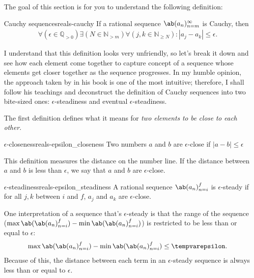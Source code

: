 The goal of this section is for you to understand the following definition:

\begin{df}{Cauchy sequences}{reals-cauchy}
  If a rational sequence $\sequence{a_n}{n = m}{\infty}$ is Cauchy, then
  \begin{align}
    \forall (\epsilon \in \mathbb{Q}_{>0}) \exists (N \in \mathbb{N}_{>m}) \forall (j, k \in \mathbb{N}_{\geq N}) : |a_j - a_k| \leq \epsilon.
  \end{align}
\end{df}

I understand that this definition looks very unfriendly, so let's break it down and
see how each element come together to capture concept of a sequence whose elements get
closer together as the sequence progresses. In my humble opinion, the approach taken
by \citeauthor{tao-1-2022} in his  book \cite{tao-1-2022} is one of the most
intuitive; therefore, I shall follow his teachings and deconstruct the definition of
Cauchy sequences into two bite-sized ones: $\epsilon$-steadiness and eventual $\epsilon$-steadiness.

The first definition defines what it means for \emph{two elements to be close to each other.}
\begin{df}{$\epsilon$-closeness}{reals-epsilon_closeness}
  Two numbers $a$ and $b$ are $\epsilon$-close if $|a - b| \leq \epsilon$
\end{df}
This definition measures the distance on the number line. If the distance between $a$
and $b$ is less than $\epsilon$, we say that $a$ and $b$ are $\epsilon$-close.

\begin{df}{$\epsilon$-steadiness}{reals-epsilon_steadiness}
  A rational sequence $\sequence{a_n}{n = i}{f}$ is $\epsilon$-steady if for all $j, k$
  between $i$ and $f$, $a_j$ and $a_k$ are $\epsilon$-close.
\end{df}

One interpretation of a sequence that's $\epsilon$-steady is that the range of the
sequence ($\max\ab(\sequence{a_n}{n = i}{f}) - \min\ab(\sequence{a_n}{n = i}{f})$) is
restricted to be less than or equal to $\epsilon$:
\begin{equation}
  \max\ab(\sequence{a_n}{n = i}{f}) - \min\ab(\sequence{a_n}{n = i}{f}) \leq \epsilon.
\end{equation}
Because of this, the distance between each term in an $\epsilon$-steady sequence is
always less than or equal to $\epsilon$.

